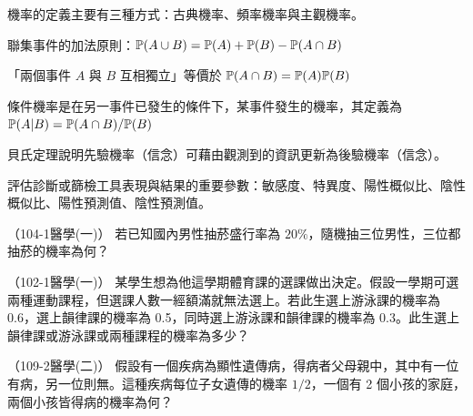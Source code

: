     \begin{takehome}
        \item 機率的定義主要有三種方式：古典機率、頻率機率與主觀機率。
        \item 聯集事件的加法原則：$\mathbb{P}(A \cup B) = \mathbb{P}(A) + \mathbb{P}(B) - \mathbb{P}(A \cap B)$
        \item 「兩個事件 $A$ 與 $B$ 互相獨立」等價於 $\mathbb{P}(A \cap B) = \mathbb{P}(A)\mathbb{P}(B)$
        \item 條件機率是在另一事件已發生的條件下，某事件發生的機率，其定義為 $\mathbb{P}(A|B) = \mathbb{P}(A \cap B) / \mathbb{P}(B)$
        \item 貝氏定理說明先驗機率（信念）可藉由觀測到的資訊更新為後驗機率（信念）。
        \item 評估診斷或篩檢工具表現與結果的重要參數：敏感度、特異度、陽性概似比、陰性概似比、陽性預測值、陰性預測值。
    \end{takehome}

    \begin{docexam}{（104-1醫學(一)）}
        若已知國內男性抽菸盛行率為 $20\%$，隨機抽三位男性，三位都抽菸的機率為何？
    \end{docexam}

    \begin{docexam}{（102-1醫學(一)）}
        某學生想為他這學期體育課的選課做出決定。假設一學期可選兩種運動課程，但選課人數一經額滿就無法選上。若此生選上游泳課的機率為 0.6，選上韻律課的機率為 0.5，同時選上游泳課和韻律課的機率為 0.3。此生選上韻律課或游泳課或兩種課程的機率為多少？
    \end{docexam}

    \begin{docexam}{（109-2醫學(二)）}
        假設有一個疾病為顯性遺傳病，得病者父母親中，其中有一位有病，另一位則無。這種疾病每位子女遺傳的機率 $1/2$，一個有 2 個小孩的家庭，兩個小孩皆得病的機率為何？
    \end{docexam}